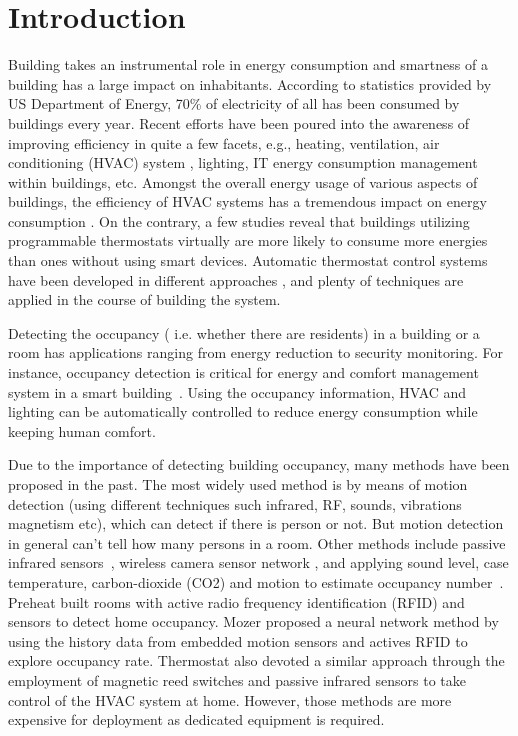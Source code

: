 \section{Introduction}

Building takes an instrumental role in energy consumption and smartness of a
building has a large impact on inhabitants. According to statistics provided by
US Department of Energy, 70\% of electricity of all has been consumed by
buildings every year. Recent efforts have been poured into the awareness of
improving efficiency in quite a few facets, e.g., heating, ventilation, air
conditioning (HVAC) system \cite{erickson2009energy}\cite{gao2009selfprog},
lighting\cite{delaney2009eval}, IT energy consumption management within
buildings\cite{agarwal2009augnet}\cite{agarwal2010sleep}, etc. Amongst the
overall energy usage of various aspects of buildings, the efficiency of HVAC
systems has a tremendous impact on energy consumption \cite{hobby2012analysis}.
On the contrary, a few studies \cite{bias1999elec} reveal that buildings
utilizing programmable thermostats virtually are more likely to consume more
energies than ones without using smart devices. Automatic thermostat control
systems have been developed in different approaches
\cite{thomas2012intelligent}\cite{lu2012eval}, and plenty of techniques are
applied in the course of building the system.

Detecting the occupancy ( i.e. whether there are residents) in a
building or a room has applications ranging from energy reduction
to security monitoring.
For instance, occupancy detection is critical for energy and comfort management
system in a smart building~\cite{Nguyen2013Energy}.
Using the occupancy information, HVAC and lighting can be
automatically controlled to reduce energy consumption while keeping
human comfort.

Due to the importance of detecting building occupancy, many methods
have been proposed in the past. The most widely used method is by
means of motion detection (using different techniques such infrared,
RF, sounds, vibrations magnetism etc), which can detect if there is
person or not. But motion detection in general can't tell how many
persons in a room.  Other methods include passive infrared
sensors~\cite{Dodier2006Building}, wireless camera sensor network
\cite{erickson2009energy}, and applying sound level, case temperature,
carbon-dioxide (CO2) and motion to estimate occupancy
number~\cite{Ekwevugbe2013Real}.  Preheat \cite{scott2011ctrl} built rooms with
active radio frequency identification (RFID) and sensors to detect
home occupancy. Mozer \cite{mozer1997neurothermostat} proposed a neural network method by
using the history data from embedded motion sensors and actives RFID
to explore occupancy rate. Thermostat \cite{lu2010smartthermostat} also devoted a
similar approach through the employment of magnetic reed switches and
passive infrared sensors to take control of the HVAC system at
home. However, those methods are more expensive for deployment as
dedicated equipment is required.

